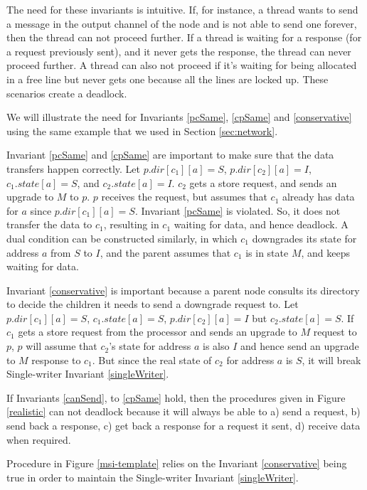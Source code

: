 The need for these invariants is intuitive. If, for instance, a thread wants to
send a message in the output channel of the node and is not able to send one
forever, then the thread can not proceed further. If a thread is waiting for a
response (for a request previously sent), and it never gets the response, the
thread can never proceed further. A thread can also not proceed if it's waiting
for being allocated in a free line but never gets one because all the lines are
locked up. These scenarios create a deadlock.

We will illustrate the need for Invariants \ref{pcSame}, \ref{cpSame} and
\ref{conservative} using the same example that we used in Section
\ref{sec:network}.

Invariant \ref{pcSame} and \ref{cpSame} are important to make sure that the data
transfers happen correctly. Let $p.dir[c_1][a] = S$, $p.dir[c_2][a] = I$,
$c_1.state[a] = S$, and $c_2.state[a] = I$. $c_2$ gets a store request, and
sends an upgrade to $M$ to $p$. $p$ receives the request, but assumes that
$c_1$ already has data for $a$ since $p.dir[c_1][a] = S$. Invariant \ref{pcSame}
is violated. So, it does not transfer the data to $c_1$, resulting in $c_1$
waiting for data, and hence deadlock. A dual condition can be constructed
similarly, in which $c_1$ downgrades its state for address $a$ from $S$ to $I$,
and the parent assumes that $c_1$ is in state $M$, and keeps waiting for data.

Invariant \ref{conservative} is important because a parent node consults its
directory to decide the children it needs to send a downgrade request to.  Let
$p.dir[c_1][a] = S$, $c_1.state[a] = S$, $p.dir[c_2][a] = I$ but
$c_2.state[a] = S$. If $c_1$ gets a store request from the processor and sends
an upgrade to $M$ request to $p$, $p$ will assume that $c_2$'s state for address $a$
is also $I$ and hence send an upgrade to $M$ response to $c_1$. But since the real
state of  $c_2$ for address $a$ is $S$, it will break Single-writer Invariant
\ref{singleWriter}.

If Invariants \ref{canSend}, to \ref{cpSame} hold, then the procedures given
in Figure \ref{realistic} can not deadlock because it will always be able to a)
send a request, b) send back a response, c) get back a response for a request
it sent, d) receive data when required.

Procedure \uReq{} in Figure \ref{msi-template} relies on the Invariant
\ref{conservative} being true in order to maintain the Single-writer Invariant
\ref{singleWriter}.

